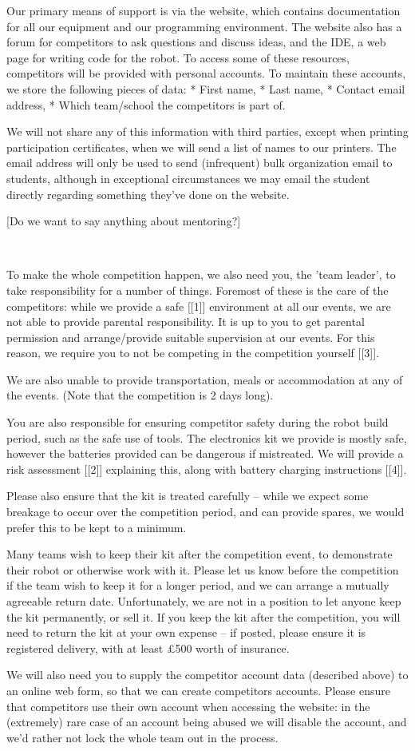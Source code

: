 \documentclass[a4paper]{article}
\begin{document}
Our primary means of support is via the website, which contains
documentation for all our equipment and our programming environment. The
website also has a forum for competitors to ask questions and discuss
ideas, and the IDE, a web page for writing code for the robot. To access
some of these resources, competitors will be provided with personal
accounts. To maintain these accounts, we store the following pieces of data:
 * First name,
 * Last name,
 * Contact email address,
 * Which team/school the competitors is part of.

We will not share any of this information with third parties, except
when printing participation certificates, when we will send a list of
names to our printers. The email address will only be used to send
(infrequent) bulk organization email to students, although in
exceptional circumstances we may email the student directly regarding
something they've done on the website.

[Do we want to say anything about mentoring?]

~

To make the whole competition happen, we also need you, the 'team
leader', to take responsibility for a number of things. Foremost of
these is the care of the competitors: while we provide a safe [[1]]
environment at all our events, we are not able to provide parental
responsibility. It is up to you to get parental permission and
arrange/provide suitable supervision at our events. For this reason, we
require you to not be competing in the competition yourself [[3]].

We are also unable to provide transportation, meals or accommodation  at
any of the events. (Note that the competition is 2 days long).

You are also responsible for ensuring competitor safety during the robot
build period, such as the safe use of tools. The electronics kit we
provide is mostly safe, however the batteries provided can be dangerous
if mistreated. We will provide a risk assessment [[2]] explaining this,
along with battery charging instructions [[4]].

Please also ensure that the kit is treated carefully -- while we expect
some breakage to occur over the competition period, and can provide
spares, we would prefer this to be kept to a minimum.

Many teams wish to keep their kit after the competition event, to
demonstrate their robot or otherwise work with it. Please let us know
before the competition if the team wish to keep it for a longer period,
and we can arrange a mutually agreeable return date. Unfortunately, we
are not in a position to let anyone keep the kit permanently, or sell
it. If you keep the kit after the competition, you will need to return
the kit at your own expense -- if posted, please ensure it is registered
delivery, with at least £500 worth of insurance.

We will also need you to supply the competitor account data (described
above) to an online web form, so that we can create competitors
accounts. Please ensure that competitors use their own account when
accessing the website: in the (extremely) rare case of an account being
abused we will disable the account, and we'd rather not lock the whole
team out in the process.
\end{document}
